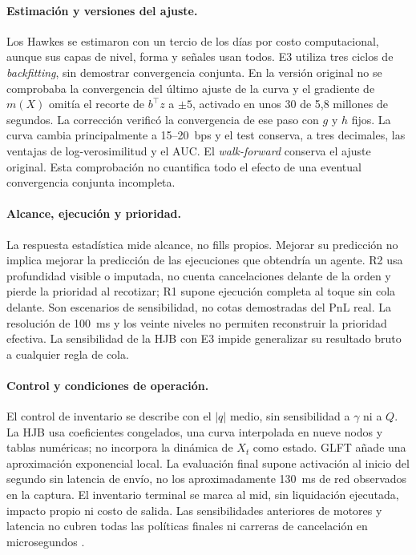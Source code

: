 \paragraph{Estimación y versiones del ajuste.}
Los Hawkes se estimaron con un tercio de los días por costo computacional, aunque sus capas de nivel, forma y señales usan todos. E3 utiliza tres ciclos de \textit{backfitting}, sin demostrar convergencia conjunta. En la versión original no se comprobaba la convergencia del último ajuste de la curva y el gradiente de $m(X)$ omitía el recorte de $b^\top z$ a $\pm5$, activado en unos 30 de 5,8 millones de segundos. La corrección verificó la convergencia de ese paso con $g$ y $h$ fijos. La curva cambia principalmente a 15--20~bps y el test conserva, a tres decimales, las ventajas de log-verosimilitud y el AUC. El \textit{walk-forward} conserva el ajuste original. Esta comprobación no cuantifica todo el efecto de una eventual convergencia conjunta incompleta.

\paragraph{Alcance, ejecución y prioridad.}
La respuesta estadística mide alcance, no fills propios. Mejorar su predicción no implica mejorar la predicción de las ejecuciones que obtendría un agente. R2 usa profundidad visible o imputada, no cuenta cancelaciones delante de la orden y pierde la prioridad al recotizar; R1 supone ejecución completa al toque sin cola delante. Son escenarios de sensibilidad, no cotas demostradas del PnL real. La resolución de 100~ms y los veinte niveles no permiten reconstruir la prioridad efectiva. La sensibilidad de la HJB con E3 impide generalizar su resultado bruto a cualquier regla de cola.

\paragraph{Control y condiciones de operación.} El control de inventario se describe con el $|q|$ medio, sin sensibilidad a $\gamma$ ni a $Q$.
La HJB usa coeficientes congelados, una curva interpolada en nueve nodos y tablas numéricas; no incorpora la dinámica de $X_t$ como estado. GLFT añade una aproximación exponencial local. La evaluación final supone activación al inicio del segundo sin latencia de envío, no los aproximadamente 130~ms de red observados en la captura. El inventario terminal se marca al mid, sin liquidación ejecutada, impacto propio ni costo de salida. Las sensibilidades anteriores de motores y latencia no cubren todas las políticas finales ni carreras de cancelación en microsegundos \citep{BudishCramtonShim2015,AquilinaBudishONeill2022}.

